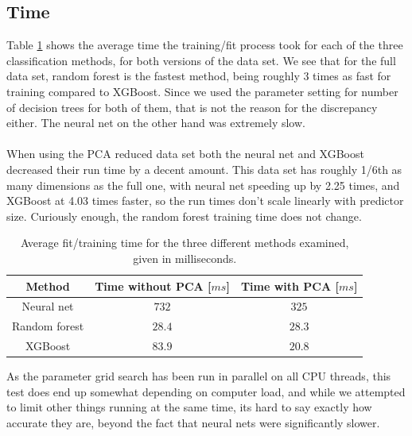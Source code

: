 \documentclass[a4paper]{article}
\newcommand\red[1]{\textcolor{red}{\textbf{#1}}}
\begin{document}
\subsection{Time}
Table \ref{tab:timing} shows the average time the training/fit process took for each of the three classification methods, for both versions of the data set. We see that for the full data set, random forest is the fastest method, being roughly 3 times as fast for training compared to XGBoost. Since we used the parameter setting for number of decision trees for both of them, that is not the reason for the discrepancy either. The neural net on the other hand was extremely slow.
\\\\
When using the PCA reduced data set both the neural net and XGBoost decreased their run time by a decent amount. This data set has roughly 1/6th as many dimensions as the full one, with neural net speeding up by 2.25 times, and XGBoost at 4.03 times faster, so the run times don't scale linearly with predictor size. Curiously enough, the random forest training time does not change.

\begin{table}[H]
  \centering
  \caption{Average fit/training time for the three different methods examined, given in milliseconds.}
  \label{tab:timing}
  \begin{tabular}{c|c|c}
    \hline\hline
    Method & Time without PCA [$ms$] & Time with PCA [$ms$] \\\hline
    Neural net & $732$ & $325$ \\
    Random forest & $28.4$ & $28.3$ \\
    XGBoost & $83.9$ & $20.8$
    \end{tabular}
\end{table}
As the parameter grid search has been run in parallel on all CPU threads, this test does end up somewhat depending on computer load, and while we attempted to limit other things running at the same time, its hard to say exactly how accurate they are, beyond the fact that neural nets were significantly slower.
\end{document}
